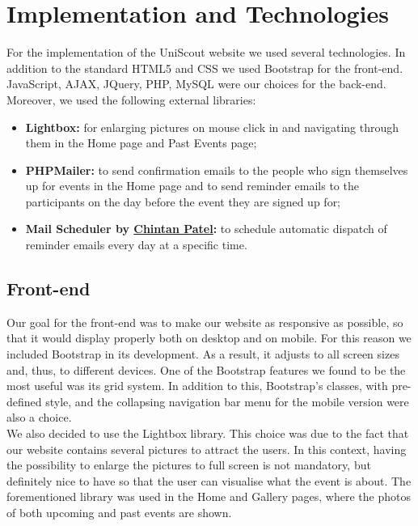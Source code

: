 \documentclass[a4paper]{article}
\begin{document}
	\section{Implementation and Technologies}
	For the implementation of the UniScout website we used several technologies. In addition to the standard HTML5 and CSS we used Bootstrap for the front-end. JavaScript, AJAX, JQuery, PHP, MySQL were our choices for the back-end.\\
	Moreover, we used the following external libraries:
	\begin{itemize}
		\item \textbf{Lightbox:} for enlarging pictures on mouse click in and navigating through them in the Home page and Past Events page;
		\item \textbf{PHPMailer:} to send confirmation emails to the people who sign themselves up for events in the Home page and to send reminder emails to the participants on the day before the event they are signed up for;
		\item \textbf{Mail Scheduler by \href{https://chynten.wordpress.com/2016/06/03/java-scheduler-to-run-every-day-on-specific-time/}{Chintan Patel}:} to schedule automatic dispatch of reminder emails every day at a specific time.
	\end{itemize}
	
	\subsection{Front-end}
	Our goal for the front-end was to make our website as responsive as possible, so that it would display properly both on desktop and on mobile. For this reason we included Bootstrap in its development. As a result, it adjusts to all screen sizes and, thus, to  different devices. One of the Bootstrap features we found to be the most useful was its grid system. In addition to this, Bootstrap's classes, with pre-defined style, and the collapsing navigation bar menu for the mobile version were also a choice.\\
	We also decided to use the Lightbox library. This choice was due to the fact that our website contains several pictures to attract the users. In this context, having the possibility to enlarge the pictures to full screen is not mandatory, but definitely nice to have so that the user can visualise what the event is about. The forementioned library was used in the Home and Gallery pages, where the photos of both upcoming and past events are shown.
	
\end{document}
